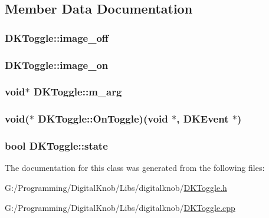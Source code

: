 \subsection{Member Data Documentation}
\hypertarget{class_d_k_toggle_ad4a831fbb2512d02dadf25d76d1d1dec}{
\subsubsection[{image\-\_\-off}]{ D\-K\-Toggle\-::image\-\_\-off}}\label{class_d_k_toggle_ad4a831fbb2512d02dadf25d76d1d1dec}
\hypertarget{class_d_k_toggle_a6475bf752a782070cbaba85c5f22d7a1}{
\subsubsection[{image\-\_\-on}]{ D\-K\-Toggle\-::image\-\_\-on}}\label{class_d_k_toggle_a6475bf752a782070cbaba85c5f22d7a1}
\hypertarget{class_d_k_toggle_ae043cb87e3c769e1ed65321a902a6b00}{
\subsubsection[{m\-\_\-arg}]{\setlength{\rightskip}{0pt plus 5cm}void$\ast$ D\-K\-Toggle\-::m\-\_\-arg}}\label{class_d_k_toggle_ae043cb87e3c769e1ed65321a902a6b00}
\hypertarget{class_d_k_toggle_ab7c5874a4fcfad5f4aad7a757c8a3790}{
\subsubsection[{On\-Toggle}]{\setlength{\rightskip}{0pt plus 5cm}void($\ast$ D\-K\-Toggle\-::\-On\-Toggle)(void $\ast$, {\bf D\-K\-Event} $\ast$)}}\label{class_d_k_toggle_ab7c5874a4fcfad5f4aad7a757c8a3790}
\hypertarget{class_d_k_toggle_ab6f9a31e36b51c88aeec88e462e1004c}{
\subsubsection[{state}]{\setlength{\rightskip}{0pt plus 5cm}bool D\-K\-Toggle\-::state}}\label{class_d_k_toggle_ab6f9a31e36b51c88aeec88e462e1004c}


The documentation for this class was generated from the following files\-:\begin{DoxyCompactItemize}
\item 
G\-:/\-Programming/\-Digital\-Knob/\-Libs/digitalknob/\hyperlink{_d_k_toggle_8h}{D\-K\-Toggle.\-h}\item 
G\-:/\-Programming/\-Digital\-Knob/\-Libs/digitalknob/\hyperlink{_d_k_toggle_8cpp}{D\-K\-Toggle.\-cpp}\end{DoxyCompactItemize}
